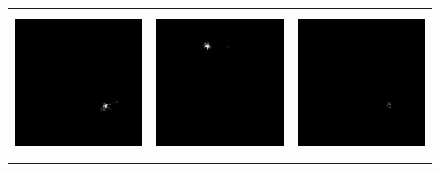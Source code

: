 \begin{figure}[t]
\begin{center}
\begin{tabular}{c c c}
            \includegraphics[width=1.5in, height=1.5in]{Counting/LaTeX/figures/putasideall/limitscaleresamplingoptionnetworkputaside/image2/touse/1.png}          & \includegraphics[width=1.5in, height=1.5in]{Counting/LaTeX/figures/putasideall/limitscaleresamplingoptionnetworkputaside/image2/touse/2.png}          & \includegraphics[width=1.5in, height=1.5in]{Counting/LaTeX/figures/putasideall/limitscaleresamplingoptionnetworkputaside/image2/touse/3.png}           \\

\end{tabular}
\end{center}
\end{figure}
